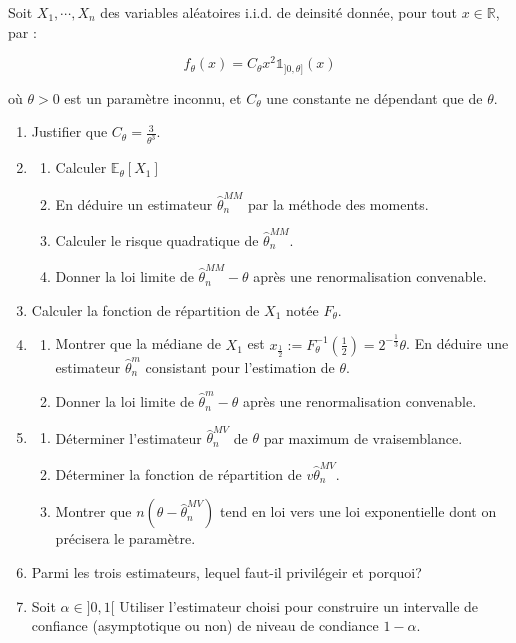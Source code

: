 \smallskip

\begin{mdframed}
\begin{exercice}
Soit $X_1, \cdots, X_n$ des variables aléatoires i.i.d. de deinsité donnée, pour tout $x \in \mathbb{R}$, par :

$$
f_\theta(x) = C_\theta x^2 \mathbb{1}_{]0,\theta]} (x)
$$

où $\theta > 0$ est un paramètre inconnu, et $C_\theta$ une constante ne dépendant que de $\theta$.

\begin{enumerate}
\item Justifier que $C_\theta = \frac{3}{\theta^3}$.
\item 
\begin{enumerate}
\item Calculer $\mathbb{E}_\theta [X_1]$
\item En déduire un estimateur $\hat{\theta}^{MM}_n$ par la méthode des moments.
\item Calculer le risque quadratique de $\hat{\theta}^{MM}_n$.
\item Donner la loi limite de $\hat{\theta}^{MM}_n - \theta$ après une renormalisation convenable.
\end{enumerate}
\item Calculer la fonction de répartition de $X_1$ notée $F_\theta$.
\item
\begin{enumerate}
\item Montrer que la médiane de $X_1$ est $x_{\frac{1}{2}} := F_\theta^{-1} (\frac{1}{2}) = 2^{-\frac{1}{3}} \theta$. En déduire une estimateur $\hat{\theta}^{m}_n$ consistant pour l'estimation de $\theta$.
\item Donner la loi limite de $\hat{\theta}^{m}_n - \theta$ après une renormalisation convenable.
\end{enumerate}
\item
\begin{enumerate}
\item Déterminer l'estimateur $\hat{\theta}^{MV}_n$ de $\theta$ par maximum de vraisemblance.
\item Déterminer la fonction de répartition de $v\hat{\theta}^{MV}_n$.
\item Montrer que $n(\theta-\hat{\theta}^{MV}_n)$ tend en loi vers une loi exponentielle dont on précisera le paramètre.
\end{enumerate}
\item Parmi les trois estimateurs, lequel faut-il privilégeir et porquoi?
\item Soit $\alpha \in ]0,1[$ Utiliser l'estimateur choisi pour construire un intervalle de confiance (asymptotique ou non) de niveau de condiance $1-\alpha$.
\end{enumerate}
\end{exercice}
\end{mdframed}